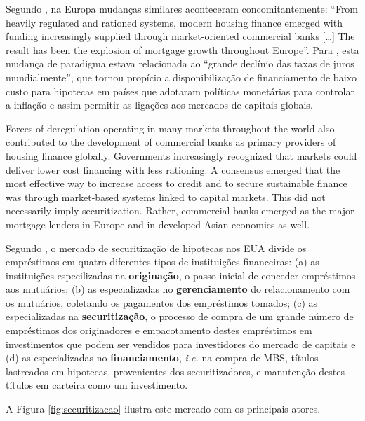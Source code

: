\documentclass[
	12pt,				%
	oneside,			%
	a4paper,			%
	chapter=TITLE,		%
	section=TITLE,		%
	english,			%
	brazil				%
	]{abntex2}
\begin{document}
\begin{refsection}
Segundo \textcite[p.~26]{green}, na Europa mudanças similares aconteceram
concomitantemente: ``From heavily regulated and rationed systems, modern housing
ﬁnance emerged with funding increasingly supplied through market-oriented
commercial banks {[}\ldots{}{]} The result has been the explosion of mortgage growth
throughout Europe''. Para \textcite[p.~26-27]{green}, esta mudança de paradigma estava
relacionada ao ``grande declínio das taxas de juros mundialmente'', que
tornou propício a disponibilização de financiamento de baixo custo para
hipotecas em países que adotaram políticas monetárias para controlar
a inflação e assim permitir as ligações aos mercados de capitais globais.
\begin{citacao}
Forces of deregulation operating in many markets throughout the world also 
contributed to the development of commercial banks as primary providers of 
housing ﬁnance globally. Governments increasingly recognized that markets could 
deliver lower cost ﬁnancing with less rationing. A consensus emerged that the 
most effective way to increase access to credit and to secure sustainable ﬁnance 
was through market-based systems linked to capital markets. This did not 
necessarily imply securitization. Rather, commercial banks emerged as the major 
mortgage lenders in Europe and in developed Asian economies as well.  
\cite[p. 26]{green}
\end{citacao}
Segundo \textcite[p.~214-215]{simkovic}, o mercado de securitização de hipotecas nos EUA
divide os empréstimos em quatro diferentes tipos de instituições financeiras:
(a) as instituições especilizadas na \textbf{originação}, o passo inicial de conceder
empréstimos aos mutuários; (b) as especializadas no \textbf{gerenciamento} do
relacionamento com os mutuários, coletando os pagamentos dos empréstimos
tomados; (c) as especializadas na \textbf{securitização}, o processo de compra de um
grande número de empréstimos dos originadores e empacotamento destes empréstimos
em investimentos que podem ser vendidos para investidores do mercado de capitais
e (d) as especializadas no \textbf{financiamento}, \emph{i.e.} na compra de \gls{MBS},
títulos lastreados em hipotecas, provenientes dos securitizadores, e manutenção
destes títulos em carteira como um investimento.

A Figura \ref{fig:securitizacao} ilustra este mercado com os principais atores.
\begin{figure}[H]


\end{figure}
\end{refsection}
\end{document}
